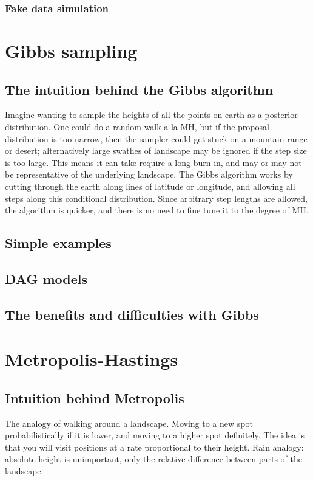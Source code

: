 \documentclass[11pt,fullpage]{book}
\begin{document}
\subsection{Fake data simulation}

\chapter{Gibbs sampling}
\section{The intuition behind the Gibbs algorithm}
Imagine wanting to sample the heights of all the points on earth as a posterior distribution. One could do a random walk a la MH, but if the proposal distribution is too narrow, then the sampler could get stuck on a mountain range or desert; alternatively large swathes of landscape may be ignored if the step size is too large. This means it can take require a long burn-in, and may or may not be representative of the underlying landscape. The Gibbs algorithm works by cutting through the earth along lines of latitude or longitude, and allowing all steps along this conditional distribution. Since arbitrary step lengths are allowed, the algorithm is quicker, and there is no need to fine tune it to the degree of MH.

\section{Simple examples}
\section{DAG models}
\section{The benefits and difficulties with Gibbs}

\chapter{Metropolis-Hastings}
\section{Intuition behind Metropolis}
The analogy of walking around a landscape. Moving to a new spot probabilistically if it is lower, and moving to a higher spot definitely. The idea is that you will visit positions at a rate proportional to their height. Rain analogy: absolute height is unimportant, only the relative difference between parts of the landscape.
\end{document}
